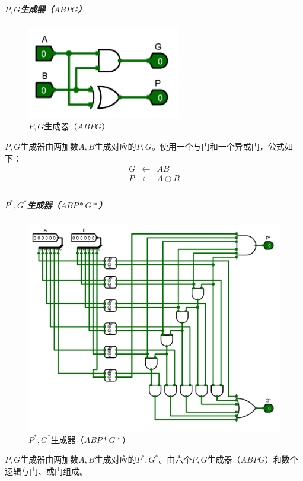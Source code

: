 \documentclass[main.tex]{subfiles}
\begin{document}
\subparagraph{$P, G$生成器（$ABPG$）}

\begin{figure}[H]
\centering
\includegraphics[width=0.6\textwidth]{images/ABGP-circuit.png}
\caption{$P, G$生成器（$ABPG$）}
\end{figure}

$P, G$生成器由两加数$A, B$生成对应的$P, G$。使用一个与门和一个异或门，公式如下：
$$
\begin{array}{rcl}
G &\leftarrow& AB \\
P &\leftarrow& A \oplus B \\
\end{array}
$$

\subparagraph{$P^*, G^*$生成器（$ABP*G*$）}

\begin{figure}[H]
\centering
\includegraphics[width=\textwidth]{images/ABGxPx-circuit.png}
\caption{$P^*, G^*$生成器（$ABP*G*$）}
\end{figure}

$P, G$生成器由两加数$A, B$生成对应的$P^*, G^*$。由六个$P, G$生成器（$ABPG$）和数个逻辑与门、或门组成。
\end{document}
